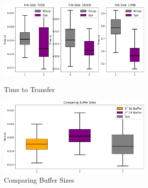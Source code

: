 \begin{figure}[!htb]
    \begin{minipage}{0.5\textwidth}
        \centering
        \includegraphics[keepaspectratio=true,width=3in]{figures/evaluation/results.png}
        \caption{Time to Transfer}
        \label{fig:results}
    \end{minipage}%
    \begin{minipage}{0.5\textwidth}
        \centering
        \includegraphics[keepaspectratio=true,width=3in]{figures/evaluation/buf_compare.png}
        \caption{Comparing \sysname Buffer Sizes}
        \label{fig:buf}
    \end{minipage}%
\end{figure}